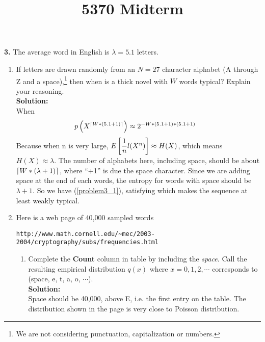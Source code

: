 \documentclass{assignment}
\title{5370 Midterm}
\begin{document}
\textbf{3.}
\label{SquishyBear}
The average word in English is $\lambda =5.1$ letters.
\begin{enumerate}
\item  If letters are drawn randomly from an $N=27$ character alphabet (A through Z and a space),\footnote{
    We are not considering punctuation, capitalization or numbers.
  }
  then when is a thick novel with $W$ words typical? Explain your reasoning. \\

  \textbf{Solution:} \\
  When
  \begin{align}
    p\left(X^{\left \lceil W*(5.1 + 1) \right \rceil}\right) & \approx 2^{-W*(5.1 + 1)*(5.1 + 1)} \label{problem3_1}
  \end{align}
  Because when n is very large, $E\left[\dfrac{1}{n}l(X^n)\right] \approx H(X)$, which means $H(X) \approx \lambda$. The number of alphabets
  here, including space, should be about $\left \lceil W * (\lambda + 1) \right \rceil$, where ``+1'' is due the space character. Since
  we are adding space at the end of each words, the entropy for words with space should be $\lambda + 1$. So we have
  (\ref{problem3_1}), satisfying which makes the sequence at least weakly typical.

\item Here is a web page of 40,000 sampled words
  \begin{center}
    \verb"http://www.math.cornell.edu/~mec/2003-2004/cryptography/subs/frequencies.html"
  \end{center}
  \begin{enumerate}
  \item Complete the {\bf Count} column in table by including the {\em space}. Call the resulting empirical
    distribution $q(x)$ where $x=0,1,2,\cdots$ corresponds to (space, e, t, a, o, $\cdots$). \\
    \textbf{Solution:} \\
    Space should be 40,000, above E, i.e. the first entry on the table.
    The distribution shown in the page is very close to Poisson distribution.


\end{enumerate}
\end{enumerate}
\end{document}

